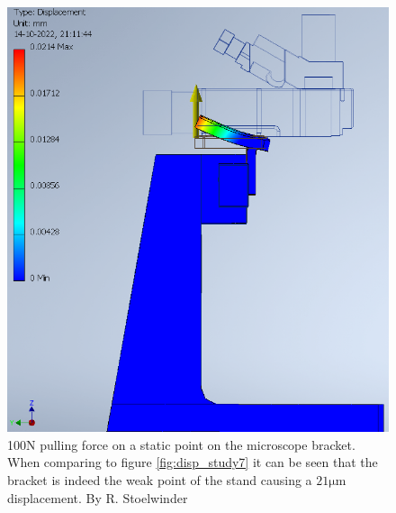 \documentclass[10pt]{article}
\begin{document}
\begin{figure}[H]
  \centering
  \begin{minipage}[b]{0.45\textwidth}
    \includegraphics[width=\textwidth]{img/rigidity_simulation/study_8.png}
    \caption{100N pulling force on a static point on the microscope bracket. When comparing to figure \ref{fig:disp_study7} it can be seen that the bracket is indeed the weak point of the stand causing a $21\mathrm{\mu m}$ displacement. By R. Stoelwinder}
    \label{fig:disp_study8}
  \end{minipage}
  \hfill
  \begin{minipage}[b]{0.45\textwidth}

\end{minipage}
\end{figure}
\end{document}
